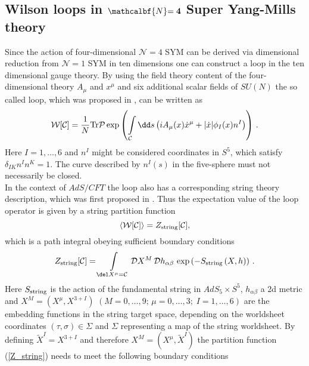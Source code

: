 \subsection[Wilson loops in $\mathcal{N} =4$ Super Yang-Mills theory]{Wilson loops in $\mathcalbf{N} \mathbf{=4}$ Super Yang-Mills theory}
Since the action of four-dimensional $\mathcal{N}=4$ SYM can be derived via dimensional reduction from $\mathcal{N}=1$ SYM in ten dimensions \cite{BRINK197777} one can construct a  loop in the ten dimensional gauge theory. By using the field theory content of the four-dimensional theory $A_{\mu}$ and $x^{\mu}$ and six additional scalar fields of $SU(N)$ the so called  loop, which was proposed in \cite{maldacena2}, can be written as
%
%
\begin{equation}
\mathcal{W}[\mathcal{C}] = \frac{1}{N}{\rm Tr}\mathcal{P} \exp \left( \int\limits_{\mathcal{C}} \dd s \left( i A_{\mu}(x)\dot{x}^{\mu} +
\vert \dot{x}\vert \phi_{I}(x) n^{I} \right) \right) \,.
\end{equation}
%
%
Here $I=1,\ldots,6$ and $n^{I}$ might be considered coordinates in $S^{5}$, which satisfy $\delta_{IK}n^{I}n^{K}=1$. The curve described by $n^{I}(s)$ in the five-sphere must not necessarily be closed. \\
%
%
In the context of $AdS/CFT$ the  loop also has a corresponding string theory description, which was first proposed in \cite{maldacena2}. Thus the expectation value of the  loop operator is given by a string partition function
%
%
\begin{equation}
\langle \mathcal{W}[\mathcal{C}]\rangle = Z_{\rm string}[\mathcal{C}],
\label{W_Z}
\end{equation}
%
%
which is a path integral obeying sufficient boundary conditions
%
%
\begin{equation}
Z_{\rm string}[\mathcal{C}] = \int\limits_{\del X^{\mu}=\mathcal{C}} \mathcal{D}X^{M}\, \mathcal{D}h_{\alpha\beta}\, \exp \left(-S_{\rm string}\left( X,h \right) \right)\,.
\label{Z_string}
\end{equation}
%
%
Here $S_{\rm string}$ is the action of the fundamental string in $AdS_{5}\times S^{5}$, $h_{\alpha\beta}$ a 2d metric and ${X^{M}=(X^{\mu},X^{3+I})}$ ${(M=0,\ldots,9;\, \mu=0,\ldots,3; \; I=1,\ldots,6)}$ are the embedding functions in the string target space, depending on the worldsheet coordinates $(\tau,\sigma)\in \Sigma$ and $\Sigma$ representing a map of the string worldsheet. By defining $\widetilde{X}^{I}=X^{3+I}$ and therefore $X^{M}=(X^{\mu},\widetilde{X}^{I})$ the partition function (\ref{Z_string}) needs to meet the following boundary conditions
